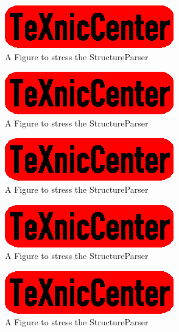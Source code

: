 \begin{figure}
	\begin{center}
		\includegraphics{txc.eps}
	\end{center}
	\caption{A Figure to stress the StructureParser}
\end{figure}

\begin{figure}
	\begin{center}
		\includegraphics{txc.eps}
	\end{center}
	\caption{A Figure to stress the StructureParser}
\end{figure}


\clearpage

\begin{figure}
	\begin{center}
		\includegraphics{txc.eps}
	\end{center}
	\caption{A Figure to stress the StructureParser}
\end{figure}

\begin{figure}
	\begin{center}
		\includegraphics{txc.eps}
	\end{center}
	\caption{A Figure to stress the StructureParser}
\end{figure}

\begin{figure}
	\begin{center}
		\includegraphics{txc.eps}
	\end{center}
	\caption{A Figure to stress the StructureParser}
\end{figure}

